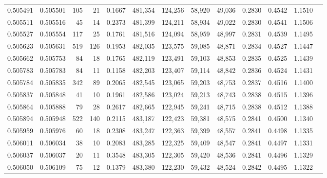 \begin{tabular}{rrrrrrrrrrrrr}
0.505491 & 0.505501 &   105 &    21 &                                     0.1667 & 481,354 & 124,256 &  58,920 &  49,036 & 0.2830 & 0.4542 & 1.1510 \\
0.505511 & 0.505516 &    45 &    14 &                                     0.2373 & 481,399 & 124,211 &  58,934 &  49,022 & 0.2830 & 0.4541 & 1.1506 \\
0.505527 & 0.505554 &   117 &    25 &                                     0.1761 & 481,516 & 124,094 &  58,959 &  48,997 & 0.2831 & 0.4539 & 1.1495 \\
0.505623 & 0.505631 &   519 &   126 &                                     0.1953 & 482,035 & 123,575 &  59,085 &  48,871 & 0.2834 & 0.4527 & 1.1447 \\
0.505662 & 0.505753 &    84 &    18 &                                     0.1765 & 482,119 & 123,491 &  59,103 &  48,853 & 0.2835 & 0.4525 & 1.1439 \\
0.505783 & 0.505783 &    84 &    11 &                                     0.1158 & 482,203 & 123,407 &  59,114 &  48,842 & 0.2836 & 0.4524 & 1.1431 \\
0.505784 & 0.505835 &   342 &    89 &                                     0.2065 & 482,545 & 123,065 &  59,203 &  48,753 & 0.2837 & 0.4516 & 1.1400 \\
0.505837 & 0.505848 &    41 &    10 &                                     0.1961 & 482,586 & 123,024 &  59,213 &  48,743 & 0.2838 & 0.4515 & 1.1396 \\
0.505864 & 0.505888 &    79 &    28 &                                     0.2617 & 482,665 & 122,945 &  59,241 &  48,715 & 0.2838 & 0.4512 & 1.1388 \\
0.505894 & 0.505948 &   522 &   140 &                                     0.2115 & 483,187 & 122,423 &  59,381 &  48,575 & 0.2841 & 0.4500 & 1.1340 \\
0.505959 & 0.505976 &    60 &    18 &                                     0.2308 & 483,247 & 122,363 &  59,399 &  48,557 & 0.2841 & 0.4498 & 1.1335 \\
0.506011 & 0.506034 &    38 &    10 &                                     0.2083 & 483,285 & 122,325 &  59,409 &  48,547 & 0.2841 & 0.4497 & 1.1331 \\
0.506037 & 0.506037 &    20 &    11 &                                     0.3548 & 483,305 & 122,305 &  59,420 &  48,536 & 0.2841 & 0.4496 & 1.1329 \\
0.506050 & 0.506109 &    75 &    12 &                                     0.1379 & 483,380 & 122,230 &  59,432 &  48,524 & 0.2842 & 0.4495 & 1.1322 \\

\end{tabular}
